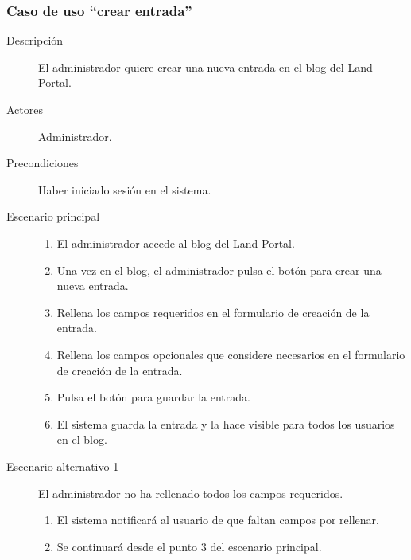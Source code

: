 \subsubsection{Caso de uso ``crear entrada''}
\begin{description}
\item[Descripción] El administrador quiere crear una nueva entrada en el blog del Land Portal.
\item[Actores] Administrador.
\item[Precondiciones] Haber iniciado sesión en el sistema.
\item[Escenario principal] \hfill
						 	\begin{enumerate}
							\item El administrador accede al blog del Land Portal.
							\item Una vez en el blog, el administrador pulsa el botón para crear una nueva entrada.
							\item Rellena los campos requeridos en el formulario de creación de la entrada.
							\item Rellena los campos opcionales que considere necesarios en el formulario de creación de la entrada.
							\item Pulsa el botón para guardar la entrada.
							\item El sistema guarda la entrada y la hace visible para todos los usuarios en el blog.
							\end{enumerate}
\item[Escenario alternativo 1] El administrador no ha rellenado todos los campos requeridos.
							\begin{enumerate}
							\item El sistema notificará al usuario de que faltan campos por rellenar.
							\item Se continuará desde el punto 3 del escenario principal.
							\end{enumerate}
\end{description}


